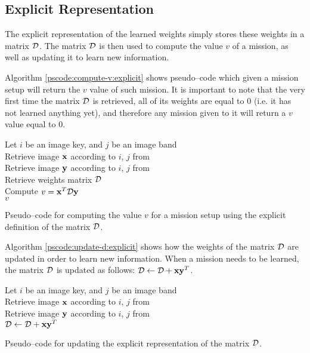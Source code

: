 \subsection{Explicit Representation} \label{subsect:meth:explicit}

The explicit representation of the learned weights simply stores these weights in a matrix $\mathcal{D}$. The matrix $\mathcal{D}$ is then used to compute the value $v$ of a mission, as well as updating it to learn new information.

Algorithm \ref{pscode:compute-v:explicit} shows pseudo--code which given a mission setup will return the $v$ value of such mission. It is important to note that the very first time the matrix $\mathcal{D}$ is retrieved, all of its weights are equal to $0$ (i.e. it has not learned anything yet), and therefore any mission given to it will return a $v$ value equal to $0$.

\begin{algorithm}[H]
    \SetAlgoLined
         {
            Let $i$ be an image key, and $j$ be an image band \\
            Retrieve image $\boldsymbol{\mathbf{x}}$ according to $i$, $j$ from \usno \\
            Retrieve image $\boldsymbol{\mathbf{y}}$ according to $i$, $j$ from \panstarrs \\
            Retrieve weights matrix $\mathcal{D}$ \\
            Compute $v = \boldsymbol{\mathbf{x}}^T \mathcal{D} \boldsymbol{\mathbf{y}}$ \\
            \Return $v$
        }
    \caption{Pseudo--code for computing the value $v$ for a mission setup using the explicit definition of the matrix $\mathcal{D}$.}
    \label{pscode:compute-v:explicit}
\end{algorithm}

Algorithm \ref{pscode:update-d:explicit} shows how the weights of the matrix $\mathcal{D}$ are updated in order to learn new information. When a mission needs to be learned, the matrix $\mathcal{D}$ is updated as follows: $\mathcal{D} \gets \mathcal{D} + \boldsymbol{\mathbf{x}}\boldsymbol{\mathbf{y}}^T$.

\begin{algorithm}[H]
    \SetAlgoLined
         {
            Let $i$ be an image key, and $j$ be an image band \\
            Retrieve image $\boldsymbol{\mathbf{x}}$ according to $i$, $j$ from \usno \\
            Retrieve image $\boldsymbol{\mathbf{y}}$ according to $i$, $j$ from \panstarrs \\
            $\mathcal{D} \gets \mathcal{D} + \boldsymbol{\mathbf{x}}\boldsymbol{\mathbf{y}}^T$ \\
        }
    \caption{Pseudo--code for updating the explicit representation of the matrix $\mathcal{D}$.}
    \label{pscode:update-d:explicit}
\end{algorithm}

